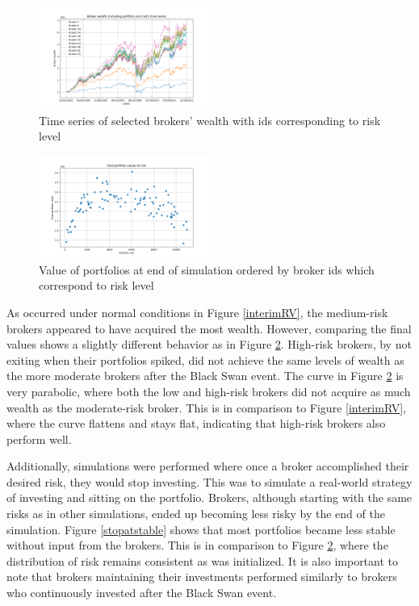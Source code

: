 \documentclass[letterpaper, 11 pt, proceedings]{IEEEtran}
\begin{document}
	\begin{figure}[h]
		\centering
		\includegraphics[width=0.5\textwidth]{timeSeriesJoint2.png}
		\caption{Time series of selected brokers' wealth with ids corresponding to risk level}
		\label{ts_03-12}
	\end{figure}
	\FloatBarrier


	\begin{figure}[h]
		\centering
		\includegraphics[width=0.5\textwidth]{valueToRisk.png}
		\caption{Value of portfolios at end of simulation ordered by broker ids which correspond to risk level}
		\label{RV}
	\end{figure}
	\FloatBarrier

	As occurred under normal conditions in Figure \ref{interimRV}, the medium-risk brokers appeared to have acquired the most wealth. However, comparing the final values shows a slightly different behavior as in Figure \ref{RV}. High-risk brokers, by not exiting when their portfolios spiked, did not achieve the same levels of wealth as the more moderate brokers after the Black Swan event. The curve in Figure \ref{RV} is very parabolic, where both the low and high-risk brokers did not acquire as much wealth as the moderate-risk broker. This is in comparison to Figure \ref{interimRV}, where the curve flattens and stays flat, indicating that high-risk brokers also perform well.
	
	Additionally, simulations were performed where once a broker accomplished their desired risk, they would stop investing. This was to simulate a real-world strategy of investing and sitting on the portfolio. Brokers, although starting with the same risks as in other simulations, ended up becoming less risky by the end of the simulation. Figure \ref{stopatstable} shows that most portfolios became less stable without input from the brokers. This is in comparison to Figure \ref{RV}, where the distribution of risk remains consistent as was initialized. It is also important to note that brokers maintaining their investments performed similarly to brokers who continuously invested after the Black Swan event.
\end{document}
